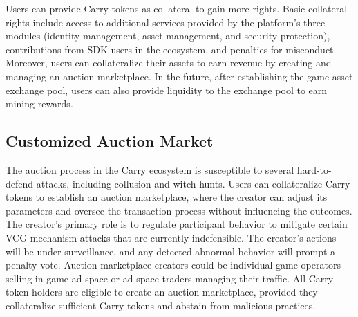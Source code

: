 Users can provide Carry tokens as collateral to gain more rights. Basic collateral rights include access to additional services provided by the platform's three modules (identity management, asset management, and security protection), contributions from SDK users in the ecosystem, and penalties for misconduct. Moreover, users can collateralize their assets to earn revenue by creating and managing an auction marketplace. In the future, after establishing the game asset exchange pool, users can also provide liquidity to the exchange pool to earn mining rewards.

\subsection{Customized Auction Market}
The auction process in the Carry ecosystem is susceptible to several hard-to-defend attacks, including collusion and witch hunts. Users can collateralize Carry tokens to establish an auction marketplace, where the creator can adjust its parameters and oversee the transaction process without influencing the outcomes. The creator's primary role is to regulate participant behavior to mitigate certain VCG mechanism attacks that are currently indefensible. The creator's actions will be under surveillance, and any detected abnormal behavior will prompt a penalty vote. Auction marketplace creators could be individual game operators selling in-game ad space or ad space traders managing their traffic. All Carry token holders are eligible to create an auction marketplace, provided they collateralize sufficient Carry tokens and abstain from malicious practices.





